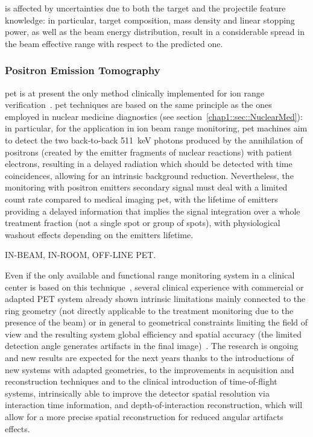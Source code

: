 is affected by uncertainties due to both the target and the projectile feature knowledge: in particular, target composition, mass density and linear stopping power, as well as the beam energy distribution, result in a considerable spread in the beam effective range with respect to the predicted one. 

\subsubsection{Positron Emission Tomography}\label{chap1::subsec::RangePET}
\gls{pet} is at present the only method clinically implemented for ion range verification~\parencite{Hishikawa2002, Enghardt2004, Parodi2007, Bauer2013}. \gls{pet} techniques are based on the same principle as the ones employed in nuclear medicine diagnostics (see section~\ref{chap1::sec::NuclearMed}): in particular, for the application in ion beam range monitoring, \gls{pet} machines aim to detect the two back-to-back 511~keV photons produced by the annihilation of positrons (created by the emitter fragments of nuclear reactions) with patient electrons, resulting in a delayed radiation which should be detected with time coincidences, allowing for an intrinsic background reduction. Nevertheless, the monitoring with positron emitters secondary signal must deal with a limited count rate compared to medical imaging \gls{pet}, with the lifetime of emitters providing a delayed information that implies the signal integration over a whole treatment fraction (not a single spot or group of spots), with physiological washout effects depending on the emitters lifetime.

IN-BEAM, IN-ROOM, OFF-LINE PET. 

Even if the only available and functional range monitoring system in a clinical center is based on this technique~\parencite{Enghardt2004}, several clinical experience with commercial or adapted PET system already shown intrinsic limitations mainly connected to the ring geometry (not directly applicable to the treatment monitoring due to the presence of the beam) or in general to geometrical constraints limiting the field of view and the resulting system global efficiency and spatial accuracy (the limited detection angle generates artifacts in the final image)~\parencite{Parodi2016}. The research is ongoing and new results are expected for the next years thanks to the introductions of new systems with adapted geometries, to the improvements in acquisition and reconstruction techniques and to the clinical introduction of time-of-flight systems, intrinsically able to improve the detector spatial resolution via interaction time information, and depth-of-interaction reconstruction, which will allow for a more precise spatial reconstruction for reduced angular artifacts effects.

